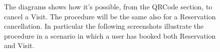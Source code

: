 \begin{figure}[H]
  \label{QRCode_handle2}
  
  \centering
   \caption{The diagrams shows how it's possible, from the QRCode section, to cancel a Visit. The procedure will be the same also for a Reservation cancellation. In particular the following screenshots illustrate the procedure in a scenario in which a user has booked both Reservation and Visit.} 
\end{figure}


